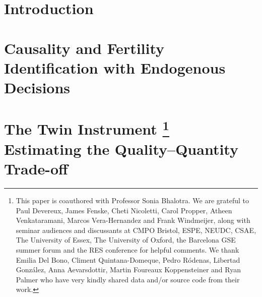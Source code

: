 \documentclass{report}[12pt]
\newcommand{\litrloc}{./literature}
\let\stdsection\thesection
\let\oldchapter\chapter
\renewcommand{\chapter}{\let\thesection\stdsection\oldchapter}
\begin{document}
\newpage
\begin{spacing}{1.4}
\setlength\parindent{0.25in}
\setlength\parskip{0.25in}


\chapter*{Introduction}

\renewcommand*{\thefootnote}{\fnsymbol{footnote}}
\chapter[Causality and Fertilty: Identification with Endogenous Decisions]%
{Causality and Fertility%
\\[2ex]\Large Identification with Endogenous Decisions}
\label{chap:fertility}
\renewcommand*{\thefootnote}{\arabic{footnote}}




\renewcommand*{\thefootnote}{\fnsymbol{footnote}}
\chapter[The Twin Instrument and Family Size]%
{The Twin Instrument%
\footnote{This paper is coauthored with Professor Sonia Bhalotra. We are 
grateful to Paul Devereux, James Fenske, Cheti Nicoletti, Carol Propper, Atheen 
Venkataramani, Marcos Vera-Hernandez and Frank Windmeijer, along with seminar 
audiences and discussants at CMPO Bristol, ESPE, NEUDC, CSAE, The University of 
Essex, The University of Oxford, the Barcelona GSE summer forum and the RES 
conference for helpful comments.  We thank Emilia Del Bono, Climent 
Quintana-Domeque, Pedro R\'odenas, Libertad Gonz\'alez, Anna Aevarsdottir, 
Martin Foureaux Koppensteiner and Ryan Palmer who have very kindly shared data 
and/or source code from their work.} 
\\[2ex]\Large Estimating the Quality--Quantity Trade-off}
\label{chap:twins}
\renewcommand*{\thefootnote}{\arabic{footnote}}


\end{spacing}
\end{document}
